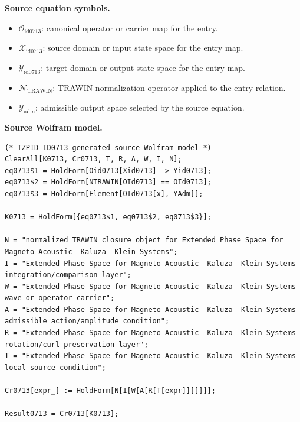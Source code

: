 \begin{minipage}[t]{0.49\linewidth}
\begingroup
\small
\raggedright
\textbf{Source equation symbols.}\par
\begin{itemize}[leftmargin=1.35em,itemsep=1pt,topsep=1pt,parsep=0pt]
    \item $\mathcal{O}_{\mathrm{id0713}}$: canonical operator or carrier map for the entry.
    \item $\mathcal{X}_{\mathrm{id0713}}$: source domain or input state space for the entry map.
    \item $\mathcal{Y}_{\mathrm{id0713}}$: target domain or output state space for the entry map.
    \item $\mathcal{N}_{\mathrm{TRAWIN}}$: TRAWIN normalization operator applied to the entry relation.
    \item $\mathcal{Y}_{\mathrm{adm}}$: admissible output space selected by the source equation.
\end{itemize}
\endgroup
\end{minipage}\hfill
\begin{minipage}[t]{0.47\linewidth}
\begingroup
\scriptsize
\raggedright
\textbf{Source Wolfram model.}\par
\begin{Verbatim}[fontsize=\tiny,breaklines=true,breakanywhere=true]
(* TZPID ID0713 generated source Wolfram model *)
ClearAll[K0713, Cr0713, T, R, A, W, I, N];
eq0713$1 = HoldForm[Oid0713[Xid0713] -> Yid0713];
eq0713$2 = HoldForm[NTRAWIN[OId0713] == OId0713];
eq0713$3 = HoldForm[Element[OId0713[x], YAdm]];

K0713 = HoldForm[{eq0713$1, eq0713$2, eq0713$3}];

N = "normalized TRAWIN closure object for Extended Phase Space for Magneto-Acoustic--Kaluza--Klein Systems";
I = "Extended Phase Space for Magneto-Acoustic--Kaluza--Klein Systems integration/comparison layer";
W = "Extended Phase Space for Magneto-Acoustic--Kaluza--Klein Systems wave or operator carrier";
A = "Extended Phase Space for Magneto-Acoustic--Kaluza--Klein Systems admissible action/amplitude condition";
R = "Extended Phase Space for Magneto-Acoustic--Kaluza--Klein Systems rotation/curl preservation layer";
T = "Extended Phase Space for Magneto-Acoustic--Kaluza--Klein Systems local source condition";

Cr0713[expr_] := HoldForm[N[I[W[A[R[T[expr]]]]]]];

Result0713 = Cr0713[K0713];
\end{Verbatim}
\endgroup
\end{minipage}

